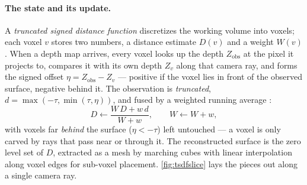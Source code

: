\documentclass[11pt]{article}
\theoremstyle{definition}
\begin{document}
\paragraph{The state and its update.} A \emph{truncated signed distance
function} discretizes the working volume into voxels; each voxel $v$
stores two numbers, a distance estimate $D(v)$ and a weight $W(v)$. When a depth
map arrives, every voxel looks up the depth $Z_{\text{obs}}$ at the
pixel it projects to, compares it with its own depth $Z_v$ along that
camera ray, and forms the signed offset
$\eta = Z_{\text{obs}} - Z_v$ --- positive if the voxel lies in front
of the observed surface, negative behind it. The observation is
\emph{truncated}, $d = \max(-\tau, \min(\tau, \eta))$, and fused by a
weighted running average \cite{CurlessLevoy1996}:
\begin{equation}
D \leftarrow \frac{W\,D + w\,d}{W + w}, \qquad W \leftarrow W + w,
\label{eq:tsdf}
\end{equation}
with voxels far \emph{behind} the surface ($\eta < -\tau$) left
untouched --- a voxel is only carved by rays that pass near or through
it. The reconstructed surface is the zero level set of $D$, extracted
as a mesh by marching cubes \cite{Lorensen1987} with linear
interpolation along voxel edges for sub-voxel placement.
\autoref{fig:tsdfslice} lays the pieces out along a single camera ray.
\end{document}
